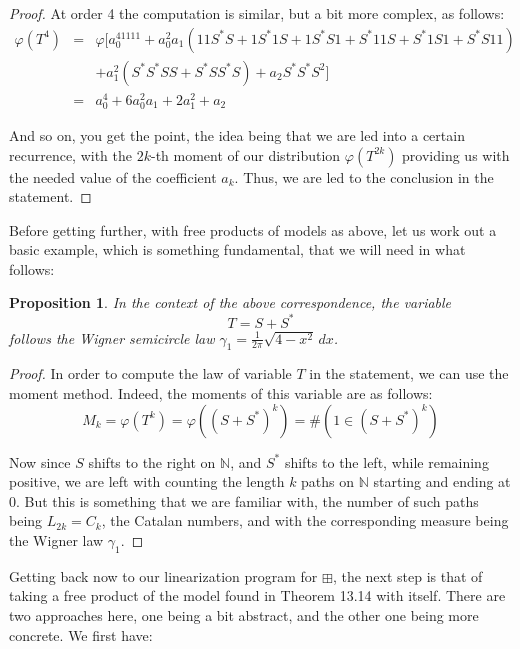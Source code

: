 \documentclass[12pt]{amsbook}
\newtheorem{proposition}[theorem]{Proposition}
\begin{document}
\begin{proof}
At order 4 the computation is similar, but a bit more complex, as follows:
\begin{eqnarray*}
\varphi(T^4)
&=&\varphi\big[a_0^41111+a_0^2a_1(11S^*S+1S^*1S+1S^*S1+S^*11S+S^*1S1+S^*S11)\\
&&+a_1^2(S^*S^*SS+S^*SS^*S)+a_2S^*S^*S^2\big]\\
&=&a_0^4+6a_0^2a_1+2a_1^2+a_2
\end{eqnarray*}

And so on, you get the point, the idea being that we are led into a certain recurrence, with the $2k$-th moment of our distribution $\varphi(T^{2k})$ providing us with the needed value of the coefficient $a_k$. Thus, we are led to the conclusion in the statement.
\end{proof}

Before getting further, with free products of models as above, let us work out a basic example, which is something fundamental, that we will need in what follows:


\begin{proposition}
In the context of the above correspondence, the variable
$$T=S+S^*$$
follows the Wigner semicircle law $\gamma_1=\frac{1}{2\pi}\sqrt{4-x^2}\,dx$.
\end{proposition}

\begin{proof}
In order to compute the law of variable $T$ in the statement, we can use the moment method. Indeed, the moments of this variable are as follows:
$$M_k
=\varphi(T^k)
=\varphi((S+S^*)^k)
=\#(1\in(S+S^*)^k)$$

Now since $S$ shifts to the right on $\mathbb N$, and $S^*$ shifts to the left, while remaining positive, we are left with counting the length $k$ paths on $\mathbb N$ starting and ending at 0. But this is something that we are familiar with, the number of such paths being $L_{2k}=C_k$, the Catalan numbers, and with the corresponding measure being the Wigner law $\gamma_1$.
\end{proof}

Getting back now to our linearization program for $\boxplus$, the next step is that of taking a free product of the model found in Theorem 13.14 with itself.  There are two approaches here, one being a bit abstract, and the other one being more concrete. We first have:

\end{document}
